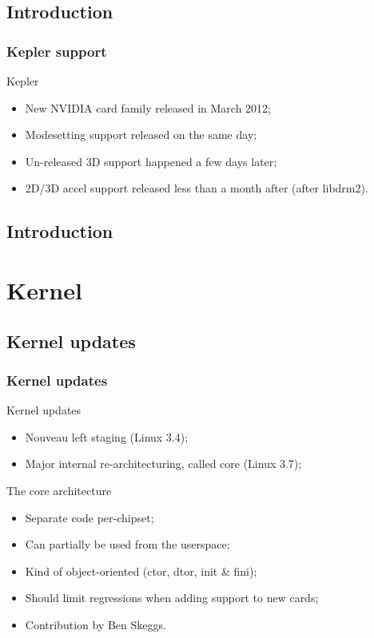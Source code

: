 \documentclass[11pt,english,compress]{beamer}
\begin{document}
\subsection{Introduction}
\begin{frame}
	\frametitle{Kepler support}

	\begin{block}{Kepler}
		\begin{itemize}
			\item New NVIDIA card family released in March 2012;
			\item Modesetting support released on the same day;
			\item Un-released 3D support happened a few days later;
			\item 2D/3D accel support released less than a month after (after libdrm2).
		\end{itemize}
	\end{block}
\end{frame}

\subsection{Introduction}

\section{Kernel}
\subsection*{Kernel updates}
\begin{frame}
	\frametitle{Kernel updates}

	\begin{block}{Kernel updates}
		\begin{itemize}
			\item Nouveau left staging (Linux 3.4);
			\item Major internal re-architecturing, called core (Linux 3.7);
		\end{itemize}
	\end{block}

	\begin{block}{The core architecture}
		\begin{itemize}
			\item Separate code per-chipset;
			\item Can partially be used from the userspace;
			\item Kind of object-oriented (ctor, dtor, init \& fini);
			\item Should limit regressions when adding support to new cards;
			\item Contribution by Ben Skeggs.
		\end{itemize}
	\end{block}
\end{frame}
\end{document}
